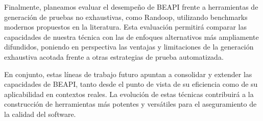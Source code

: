 Finalmente, planeamos evaluar el desempeño de BEAPI frente a herramientas de generación de pruebas no exhaustivas, como Randoop, 
utilizando benchmarks modernos propuestos en la literatura. Esta evaluación permitirá comparar las capacidades de nuestra técnica con las de enfoques alternativos más ampliamente difundidos, 
poniendo en perspectiva las ventajas y limitaciones de la generación exhaustiva acotada frente a otras estrategias de prueba automatizada.

En conjunto, estas líneas de trabajo futuro apuntan a consolidar y extender las capacidades de BEAPI, 
tanto desde el punto de vista de su eficiencia como de su aplicabilidad en contextos reales. 
La evolución de estas técnicas contribuirá a la construcción de herramientas más potentes y versátiles para el aseguramiento de la calidad del software.
